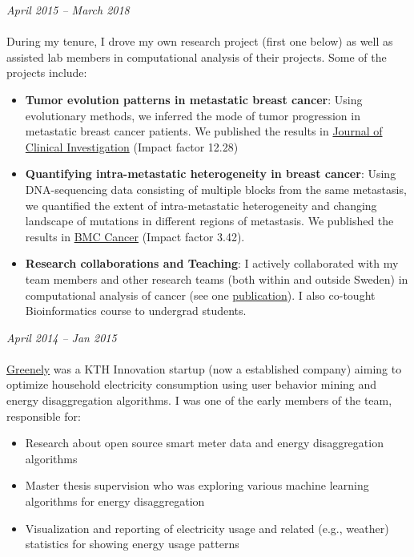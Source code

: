 \documentclass[margin, 10pt]{res} %
\begin{document}
\begin{resume}
{\sl \textbf{}} \hfill \textit{April 2015 -- March 2018} \\
{\color{RubineRed}{Radiumhemmet, Karolinska University Hospital}} \\
During my tenure, I drove my own research project (first one below) as well as assisted lab members in computational analysis of their projects. Some of the projects include:
\begin{itemize}
\item \textbf{Tumor evolution patterns in metastatic breast cancer}: Using evolutionary methods, we inferred the mode of tumor progression in metastatic breast cancer patients. We published the results in \href{https://www.jci.org/articles/view/96149}{Journal of Clinical Investigation} (Impact factor 12.28)
\item \textbf{Quantifying intra-metastatic heterogeneity in breast cancer}: Using DNA-sequencing data consisting of multiple blocks from the same metastasis, we quantified the extent of intra-metastatic heterogeneity and changing landscape of mutations in different regions of metastasis. We published the results in \href{https://bmccancer.biomedcentral.com/articles/10.1186/s12885-017-3815-2}{BMC Cancer} (Impact factor 3.42).
\item \textbf{Research collaborations and Teaching}: I actively collaborated with my team members and other research teams (both within and outside Sweden) in computational analysis of cancer (see one \href{https://bmccancer.biomedcentral.com/articles/10.1186/s12885-018-4021-6}{publication}). I also co-tought Bioinformatics course to undergrad students.
\end{itemize}


{\sl \textbf{}} \hfill \textit{April 2014 -- Jan 2015} \\
{\color{RubineRed}{Greenely, Sweden}} \\
\href{http://www.greenely.com}{Greenely} was a KTH Innovation startup (now a established company) aiming to optimize household electricity consumption using user behavior mining and energy disaggregation algorithms. 
I was one of the early members of the team, responsible for:
\begin{itemize} 
\item Research about open source smart meter data and energy disaggregation algorithms
\item Master thesis supervision who was exploring various machine learning algorithms for energy disaggregation 
\item Visualization and reporting of electricity usage and related (e.g., weather) statistics for showing energy usage patterns
\end{itemize} 


\end{resume}
\end{document}
